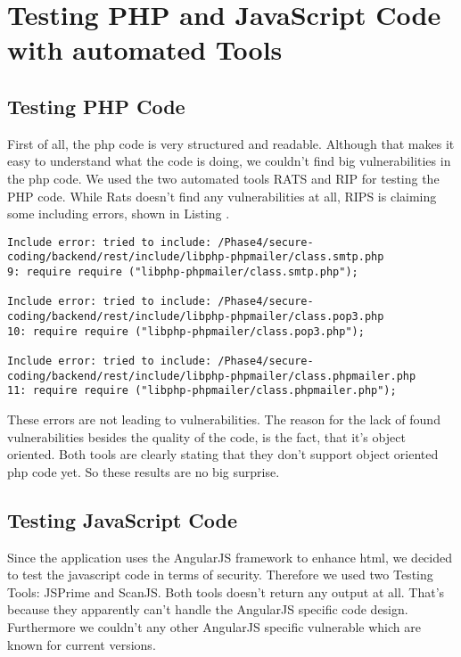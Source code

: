 \chapter{Testing PHP and JavaScript Code with automated Tools}

\section{Testing PHP Code}

First of all, the php code is very structured and readable. Although that makes it easy to understand what the code is doing, we couldn't find big vulnerabilities in the php code.
We used  the two automated tools RATS and RIP for testing the PHP code. While Rats doesn't find any vulnerabilities at all, RIPS is claiming some including errors, shown in Listing .
\begin{lstlisting}[caption= Output of automated testing tool RIPS]
Include error: tried to include: /Phase4/secure-coding/backend/rest/include/libphp-phpmailer/class.smtp.php
9: require require ("libphp-phpmailer/class.smtp.php"); 

Include error: tried to include: /Phase4/secure-coding/backend/rest/include/libphp-phpmailer/class.pop3.php
10: require require ("libphp-phpmailer/class.pop3.php"); 

Include error: tried to include: /Phase4/secure-coding/backend/rest/include/libphp-phpmailer/class.phpmailer.php
11: require require ("libphp-phpmailer/class.phpmailer.php"); 
\end{lstlisting}
These errors are not leading to vulnerabilities. The reason for the lack of found vulnerabilities besides the quality of the code, is the fact, that it's object oriented. Both tools are clearly stating that they don't support object oriented php code yet. So these results are no big surprise.

\section{Testing JavaScript Code}
Since the application uses  the AngularJS framework to enhance html, we decided to test the javascript code in terms of security. Therefore we used two Testing Tools: JSPrime and ScanJS. Both tools doesn't return any output at all. That's because they apparently can't handle the AngularJS specific code design. Furthermore we couldn't any other AngularJS specific vulnerable which are known for current versions.




 